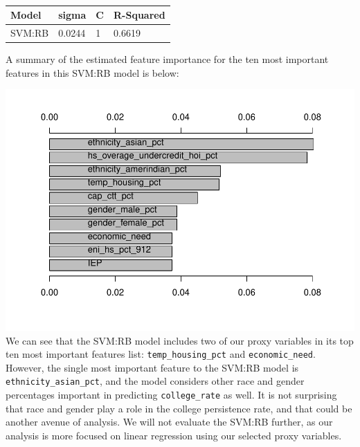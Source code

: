 \documentclass[
  man,floatsintext]{apa6}
\begin{document}
\begin{table}[H]

\begin{center}
\begin{threeparttable}

\caption{\label{tab:unnamed-chunk-8}}

\begin{tabular}{llll}
\toprule
Model & \multicolumn{1}{c}{sigma} & \multicolumn{1}{c}{C} & \multicolumn{1}{c}{R-Squared}\\
\midrule
SVM:RB & 0.0244 & 1 & 0.6619\\
\bottomrule
\end{tabular}

\end{threeparttable}
\end{center}

\end{table}

A summary of the estimated feature importance for the ten most important features in this SVM:RB model is below:

\includegraphics{final-project_files/figure-latex/unnamed-chunk-9-1.pdf}
We can see that the SVM:RB model includes two of our proxy variables in its top ten most important features list: \texttt{temp\_housing\_pct} and \texttt{economic\_need}. However, the single most important feature to the SVM:RB model is \texttt{ethnicity\_asian\_pct}, and the model considers other race and gender percentages important in predicting \texttt{college\_rate} as well. It is not surprising that race and gender play a role in the college persistence rate, and that could be another avenue of analysis. We will not evaluate the SVM:RB further, as our analysis is more focused on linear regression using our selected proxy variables.
\end{document}
